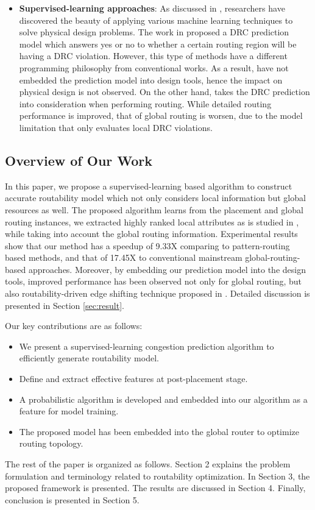 \begin{itemize}
\item \textbf{Supervised-learning approaches}: As discussed in \cite{mlinphysicaldesign}, researchers have discovered the beauty of applying various machine learning techniques to solve physical design problems. The work in \cite{drcpredict18} proposed a DRC prediction model which answers yes or no to whether a certain routing region will be having a DRC violation. However, this type of methods have a different programming philosophy from conventional works. As a result, \cite{drcpredict18,drcDAT18} have not embedded the prediction model into design tools, hence the impact on physical design is not observed. On the other hand, \cite{drcingr} takes the DRC prediction into consideration when performing routing. While detailed routing performance is improved, that of global routing is worsen, due to the model limitation that only evaluates local DRC violations.
\end{itemize}


\subsection{Overview of Our Work}
In this paper, we propose a supervised-learning based algorithm to construct accurate routability model which not only considers local information but global resources as well. The proposed algorithm learns from the placement and global routing instances, we extracted highly ranked local attributes as is studied in \cite{parameterstudy}, while taking into account the global routing information. Experimental results show that our method has a speedup of 9.33X comparing to pattern-routing based methods, and that of 17.45X to conventional mainstream global-routing-based approaches. Moreover, by embedding our prediction model into the design tools, improved performance has been observed not only for global routing, but also routability-driven edge shifting technique proposed in \cite{fastroute}. Detailed discussion is presented in Section \ref{sec:result}. 

Our key contributions are as follows:
\begin{itemize}
\item We present a supervised-learning congestion prediction algorithm to efficiently generate routability model.
\item Define and extract effective features at post-placement stage.
\item A probabilistic algorithm is developed and embedded into our algorithm as a feature for model training.
\item The proposed model has been embedded into the global router to optimize routing topology.
\end{itemize}

The rest of the paper is organized as follows. Section 2 explains the problem formulation and terminology related to routability optimization. In Section 3, the proposed framework is presented. The results are discussed in Section 4. Finally, conclusion is presented in Section 5.
